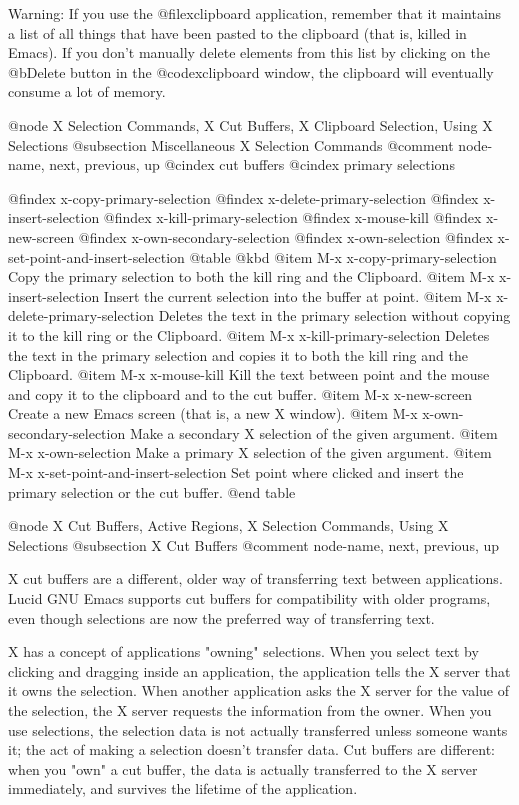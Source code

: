 {{{{Warning: If you use the @file{xclipboard} application, remember that it
maintains a list of all things that have been pasted to the clipboard
(that is, killed in Emacs).  If you don't manually delete elements from
this list by clicking on the @b{Delete} button in the @code{xclipboard}
window, the clipboard will eventually consume a lot of memory.

@node X Selection Commands, X Cut Buffers, X Clipboard Selection, Using X Selections
@subsection Miscellaneous X Selection Commands
@comment  node-name,  next,  previous,  up
@cindex cut buffers
@cindex primary selections

@findex x-copy-primary-selection
@findex x-delete-primary-selection
@findex x-insert-selection
@findex x-kill-primary-selection
@findex x-mouse-kill
@findex x-new-screen 
@findex x-own-secondary-selection
@findex x-own-selection
@findex x-set-point-and-insert-selection
@table @kbd
@item M-x x-copy-primary-selection
Copy the primary selection to both the kill ring and the Clipboard.
@item M-x x-insert-selection
Insert the current selection into the buffer at point.
@item M-x x-delete-primary-selection
Deletes the text in the primary selection without copying it to the kill
ring or the Clipboard.
@item M-x x-kill-primary-selection
Deletes the text in the primary selection and copies it to 
both the kill ring and the Clipboard.
@item M-x x-mouse-kill
Kill the text between point and the mouse and copy it to 
the clipboard and to the cut buffer.
@item M-x x-new-screen
Create a new Emacs screen (that is, a new X window).
@item M-x x-own-secondary-selection
Make a secondary X selection of the given argument. 
@item M-x x-own-selection
Make a primary X selection of the given argument.  
@item M-x x-set-point-and-insert-selection
Set point where clicked and insert the primary selection or the
cut buffer.
@end table

@node X Cut Buffers, Active Regions, X Selection Commands, Using X Selections
@subsection X Cut Buffers
@comment  node-name,  next,  previous,  up

X cut buffers are a different, older way of transferring text between
applications.  Lucid GNU Emacs supports cut buffers for compatibility
with older programs, even though selections are now the preferred way of
transferring text.

X has a concept of applications "owning" selections.  When you select
text by clicking and dragging inside an application, the application
tells the X server that it owns the selection.  When another
application asks the X server for the value of the selection, the X
server requests the information from the owner. When you use
selections, the selection data is not actually transferred unless
someone wants it; the act of making a selection doesn't transfer data.
Cut buffers are different: when you "own" a cut buffer, the data is
actually transferred to the X server immediately, and survives the
lifetime of the application.

}}}}
